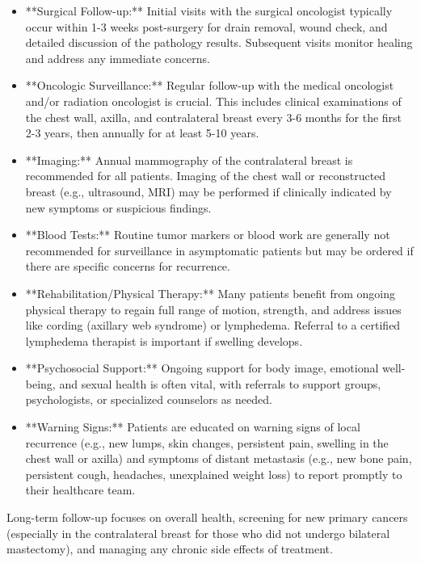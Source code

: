\begin{itemize}
  \item **Surgical Follow-up:** Initial visits with the surgical oncologist typically occur within 1-3 weeks post-surgery for drain removal, wound check, and detailed discussion of the pathology results. Subsequent visits monitor healing and address any immediate concerns.
  \item **Oncologic Surveillance:** Regular follow-up with the medical oncologist and/or radiation oncologist is crucial. This includes clinical examinations of the chest wall, axilla, and contralateral breast every 3-6 months for the first 2-3 years, then annually for at least 5-10 years.
  \item **Imaging:** Annual mammography of the contralateral breast is recommended for all patients. Imaging of the chest wall or reconstructed breast (e.g., ultrasound, MRI) may be performed if clinically indicated by new symptoms or suspicious findings.
  \item **Blood Tests:** Routine tumor markers or blood work are generally not recommended for surveillance in asymptomatic patients but may be ordered if there are specific concerns for recurrence.
  \item **Rehabilitation/Physical Therapy:** Many patients benefit from ongoing physical therapy to regain full range of motion, strength, and address issues like cording (axillary web syndrome) or lymphedema. Referral to a certified lymphedema therapist is important if swelling develops.
  \item **Psychosocial Support:** Ongoing support for body image, emotional well-being, and sexual health is often vital, with referrals to support groups, psychologists, or specialized counselors as needed.
  \item **Warning Signs:** Patients are educated on warning signs of local recurrence (e.g., new lumps, skin changes, persistent pain, swelling in the chest wall or axilla) and symptoms of distant metastasis (e.g., new bone pain, persistent cough, headaches, unexplained weight loss) to report promptly to their healthcare team.
\end{itemize}
Long-term follow-up focuses on overall health, screening for new primary cancers (especially in the contralateral breast for those who did not undergo bilateral mastectomy), and managing any chronic side effects of treatment.

